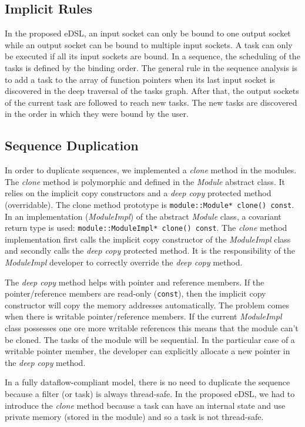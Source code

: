 \subsection{Implicit Rules}

In the proposed eDSL, an input socket can only be bound to one output socket
while an output socket can be bound to multiple input sockets. A task can only
be executed if all its input sockets are bound. In a sequence, the scheduling of
the tasks is defined by the binding order. The general rule in the sequence
analysis is to add a task to the array of function pointers when its last input
socket is discovered in the deep traversal of the tasks graph. After that, the
output sockets of the current task are followed to reach new tasks. The new
tasks are discovered in the order in which they were bound by the user.

\subsection{Sequence Duplication}

In order to duplicate sequences, we implemented a \emph{clone} method in the
modules. The \emph{clone} method is polymorphic and defined in the \emph{Module}
abstract class. It relies on the implicit copy constructors and a \emph{deep
copy} protected method (overridable). The clone method prototype is
\verb|module::Module* clone() const|. In an implementation (\emph{ModuleImpl})
of the abstract \emph{Module} class, a covariant return type is used:
\verb|module::ModuleImpl* clone() const|. The \emph{clone} method implementation
first calls the implicit copy constructor of the \emph{ModuleImpl} class and
secondly calls the \emph{deep copy} protected method. It is the responsibility
of the \emph{ModuleImpl} developer to correctly override the \emph{deep copy}
method.

The \emph{deep copy} method helps with pointer and reference members. If the
pointer/reference members are read-only (\verb|const|), then the implicit copy
constructor will copy the memory addresses automatically. The problem comes
when there is writable pointer/reference members. If the current
\emph{ModuleImpl} class possesses one ore more writable references this means
that the module can't be cloned. The tasks of the module will be sequential. In
the particular case of a writable pointer member, the developer can explicitly
allocate a new pointer in the \emph{deep copy} method.

In a fully dataflow-compliant model, there is no need to duplicate the sequence
because a filter (or task) is always thread-safe. In the proposed eDSL, we had
to introduce the \emph{clone} method because a task can have an internal state
and use private memory (stored in the module) and so a task is not thread-safe.

